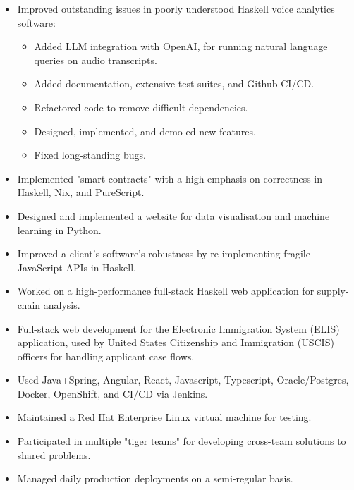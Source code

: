 \documentclass[10pt,a4paper,ragged2e,withhyper]{custom}
\begin{document}
\begin{paracol}{2}
\begin{itemize}
  \item Improved outstanding issues in poorly understood Haskell voice analytics software:
    \begin{itemize}
      \item Added LLM integration with OpenAI, for running natural language queries on audio transcripts.
      \item Added documentation, extensive test suites, and Github CI/CD.
      \item Refactored code to remove difficult dependencies.
      \item Designed, implemented, and demo-ed new features.
      \item Fixed long-standing bugs.
    \end{itemize}
\end{itemize}

\divider


\begin{itemize}
    \item Implemented "smart-contracts" with a high emphasis on correctness in Haskell, Nix, and PureScript.
    \item Designed and implemented a website for data visualisation and machine learning in Python.
    \item Improved a client's software's robustness by re-implementing fragile JavaScript APIs in Haskell.
    \item Worked on a high-performance full-stack Haskell web application for supply-chain analysis.
\end{itemize}

\divider


\begin{itemize}
    \item Full-stack web development for the Electronic Immigration System (ELIS) application, used by United States Citizenship and Immigration (USCIS) officers for handling applicant case flows.
    \item Used Java+Spring, Angular, React, Javascript, Typescript, Oracle/Postgres, Docker, OpenShift, and CI/CD via Jenkins.
    \item Maintained a Red Hat Enterprise Linux virtual machine for testing.
    \item Participated in multiple "tiger teams" for developing cross-team solutions to shared problems.
    \item Managed daily production deployments on a semi-regular basis.
\end{itemize}


\end{paracol}
\end{document}
